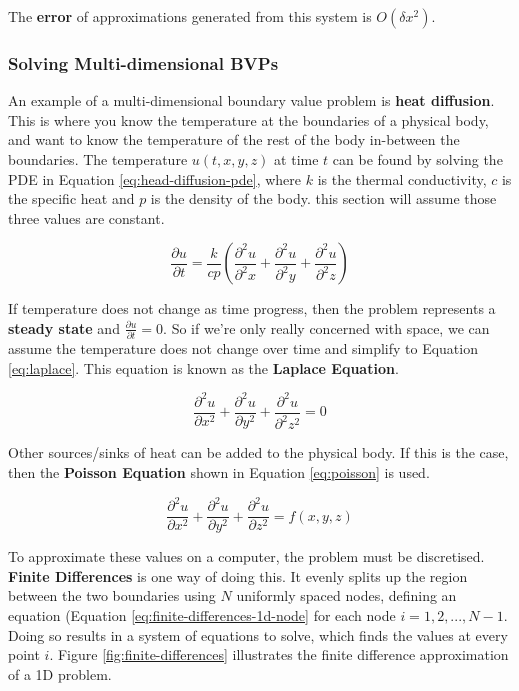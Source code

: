 \documentclass{article}
\begin{document}
The \textbf{error} of approximations generated from this system is $O(\delta x^2)$.

\subsubsection{Solving Multi-dimensional BVPs}

An example of a multi-dimensional boundary value problem is \textbf{heat diffusion}. This is where you know the temperature at the boundaries of a physical body, and want to know the temperature of the rest of the body in-between the boundaries. The temperature $u(t, x, y, z)$ at time $t$ can be found by solving the PDE in Equation \ref{eq:head-diffusion-pde}, where $k$ is the thermal conductivity, $c$ is the specific heat and $p$ is the density of the body. this section will assume those three values are constant.

\begin{equation}
	\frac{\partial u}{\partial t} = \frac{k}{cp} \left( \frac{\partial^2 u}{\partial^2 x} + \frac{\partial^2 u}{\partial^2 y} + \frac{\partial^2 u}{\partial^2 z}  \right)
	\label{eq:head-diffusion-pde}
\end{equation}

If temperature does not change as time progress, then the problem represents a \textbf{steady state} and $\frac{\partial u}{\partial t} = 0$. So if we're only really concerned with space, we can assume the temperature does not change over time and simplify to Equation \ref{eq:laplace}. This equation is known as the \textbf{Laplace Equation}.

\begin{equation}
	\frac{\partial^2 u}{\partial x^2} + \frac{\partial^2 u}{\partial y^2} + \frac{\partial^2 u}{\partial^2 z^2} = 0
	\label{eq:laplace}
\end{equation}

Other sources/sinks of heat can be added to the physical body. If this is the case, then the \textbf{Poisson Equation} shown in Equation \ref{eq:poisson} is used. 

\begin{equation}
	\frac{\partial^2 u}{\partial x^2} + \frac{\partial^2 u}{\partial y^2} + \frac{\partial^2 u}{\partial z^2} = f(x, y, z)
	\label{eq:poisson}
\end{equation}

To approximate these values on a computer, the problem must be discretised. \textbf{Finite Differences} is one way of doing this. It evenly splits up the region between the two boundaries using $N$ uniformly spaced nodes, defining an equation (Equation \ref{eq:finite-differences-1d-node} for each node $i = 1, 2, ..., N - 1$. Doing so results in a system of equations to solve, which finds the values at every point $i$. Figure \ref{fig:finite-differences} illustrates the finite difference approximation of a 1D problem.
\end{document}
